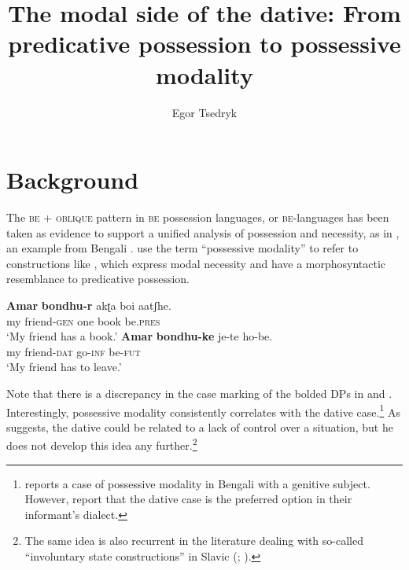 \documentclass[output=paper,colorlinks,citecolor=brown,nonflat]{./langscibook}
\author{Egor Tsedryk	\affiliation{Saint Mary’s University}}
\title{The modal side of the dative: From predicative possession to possessive modality}
\begin{document}
\maketitle 
{}

\section{Background}\label{sec:tsedryk:1}

The \textsc{be} + \textsc{oblique} pattern in \textsc{be} possession languages, or \textsc{be}{}-languages \citep{Isačenko1974} has been taken as evidence to support a unified analysis of possession and necessity, as in , an example from Bengali \citep[43]{BjorkmanCowper2016}. \citet[31]{BjorkmanCowper2016} use the term “possessive modality” to refer to constructions like , which express modal necessity and have a morphosyntactic resemblance to predicative possession. 

\ea%
    \label{ex:tsedryk:1}
    \ea\label{ex:tsedryk:1a}
    \gll    \textbf{Amar}    \textbf{bondhu-r}     {akʈa}   {boi}     {aatʃhe}.\\
            my       friend-\textsc{gen}  one     book   be.\textsc{pres}\\
    \glt    ‘My friend has a book.’
    \ex\label{ex:tsedryk:1b}
    \gll    \textbf{Amar}    \textbf{bondhu-ke}    {je-te}     {ho-be}.\\
            my friend-\textsc{dat}    go-\textsc{inf}   be-\textsc{fut}\\
    \glt    ‘My friend has to leave.’
    \z
\z


Note that there is a discrepancy in the case marking of the bolded DPs in  and . Interestingly, possessive modality consistently correlates with the dative case.\footnote{\citet[example 7]{Bhatt1997} reports a case of possessive modality in Bengali with a genitive subject. However, \citet[46]{BjorkmanCowper2016} report that the dative case is the preferred option in their informant’s dialect.} As \citet[section 8.1]{Bhatt1997} suggests, the dative could be related to a lack of control over a situation, but he does not develop this idea any further.\footnote{The same idea is also recurrent in the literature dealing with so-called “involuntary state constructions” in Slavic (\citealt[154]{Rivero2009}; \citealt[312]{RiveroArregui2012}).}  
\end{document}
